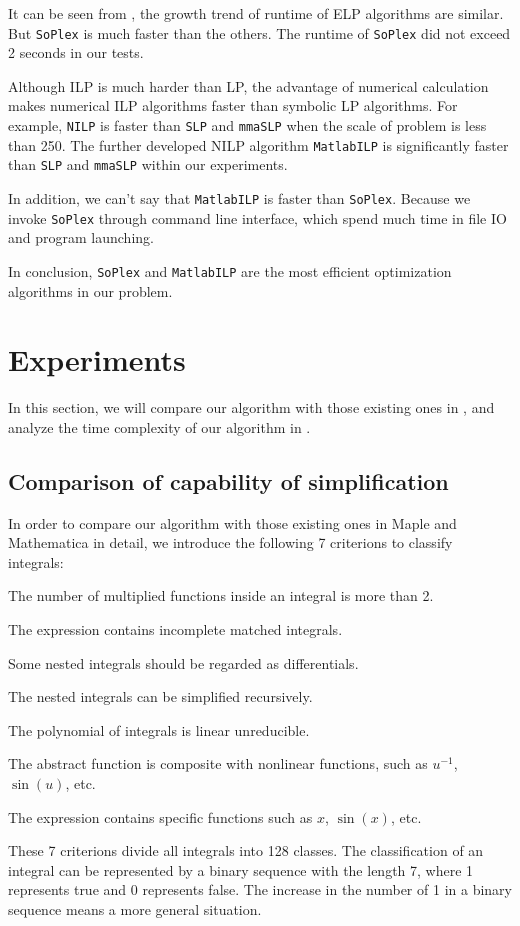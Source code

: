 It can be seen from , the growth trend of runtime of ELP algorithms are similar. But \texttt{SoPlex} is much faster than the others. The runtime of \texttt{SoPlex} did not exceed 2 seconds in our tests.

Although ILP is much harder than LP, the advantage of numerical calculation makes numerical ILP algorithms faster than symbolic LP algorithms. For example, \texttt{NILP} is faster than \texttt{SLP} and \texttt{mmaSLP} when the scale of problem is less than 250. The further developed NILP algorithm \texttt{MatlabILP} is significantly faster than \texttt{SLP} and \texttt{mmaSLP} within our experiments. 

In addition, we can't say that \texttt{MatlabILP} is faster than \texttt{SoPlex}. Because we invoke \texttt{SoPlex} through command line interface, which spend much time in file IO and program launching.

In conclusion, \texttt{SoPlex} and \texttt{MatlabILP} are the most efficient optimization algorithms in our problem.

\section{Experiments} \label{Results-03}
In this section, we will compare our algorithm with those existing ones in , and analyze the time complexity of our algorithm in .

\subsection{Comparison of capability of simplification}\label{sec5.1-03}
In order to compare our algorithm with those existing ones in Maple and Mathematica in detail,  we introduce the following 7 criterions to classify integrals:
\begin{compactenum}[1) ]
\item The number of multiplied functions inside an integral is more than 2.
\item The expression contains incomplete matched integrals.
\item Some nested integrals should be regarded as differentials.
\item The nested integrals can be simplified recursively. 
\item The polynomial of integrals is linear unreducible.
\item The abstract function is composite with nonlinear functions, such as $u^{-1}$, $\sin(u)$, etc.  
\item The expression contains specific functions such as $x$, $\sin(x)$, etc. 
\end{compactenum} 
These 7 criterions divide all integrals into 128 classes. The classification of an integral can be represented by a binary sequence with the length 7, where 1 represents true and 0 represents false. The increase in the number of 1 in a binary sequence means a more general situation.

